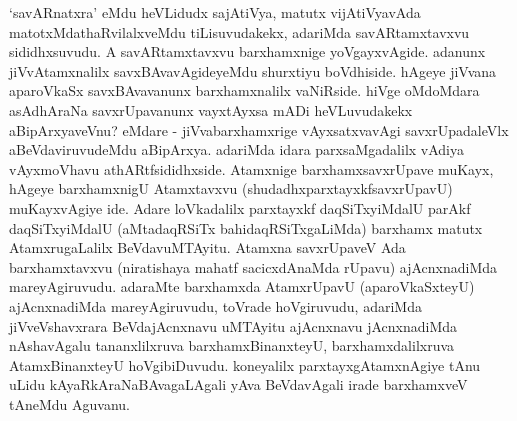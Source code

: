 \begin{artha}
`savARnatxra' eMdu heVLidudx sajAtiVya, matutx vijAtiVyavAda matotxMdathaRvilalxveMdu tiLisuvudakekx, adariMda savARtamxtavxvu sididhxsuvudu. A savARtamxtavxvu barxhamxnige yoVgayxvAgide. adanunx jiVvAtamxnalilx savxBAvavAgideyeMdu shurxtiyu boVdhiside. hAgeye jiVvana aparoVkaSx savxBAvavanunx barxhamxnalilx vaNiRside. hiVge oMdoMdara asAdhAraNa savxrUpavanunx vayxtAyxsa mADi heVLuvudakekx aBipArxyaveVnu? eMdare - jiVvabarxhamxrige vAyxsatxvavAgi savxrUpadaleVlx aBeVdaviruvudeMdu aBipArxya. adariMda idara parxsaMgadalilx vAdiya vAyxmoVhavu athARtfsididhxside. Atamxnige barxhamxsavxrUpave muKayx, hAgeye barxhamxnigU Atamxtavxvu (shudadhxparxtayxkfsavxrUpavU) muKayxvAgiye ide. Adare loVkadalilx parxtayxkf daqSiTxyiMdalU parAkf daqSiTxyiMdalU (aMtadaqRSiTx bahidaqRSiTxgaLiMda) barxhamx matutx AtamxrugaLalilx BeVdavuMTAyitu. Atamxna savxrUpaveV Ada barxhamxtavxvu (niratishaya mahatf sacicxdAnaMda rUpavu) ajAcnxnadiMda mareyAgiruvudu. adaraMte barxhamxda AtamxrUpavU (aparoVkaSxteyU) ajAcnxnadiMda mareyAgiruvudu, toVrade hoVgiruvudu, adariMda jiVveVshavxrara BeVdajAcnxnavu uMTAyitu ajAcnxnavu jAcnxnadiMda nAshavAgalu tananxlilxruva barxhamxBinanxteyU, barxhamxdalilxruva AtamxBinanxteyU hoVgibiDuvudu. koneyalilx parxtayxgAtamxnAgiye tAnu uLidu kAyaRkAraNaBAvagaLAgali yAva BeVdavAgali irade barxhamxveV tAneMdu Aguvanu. 
\end{artha}

